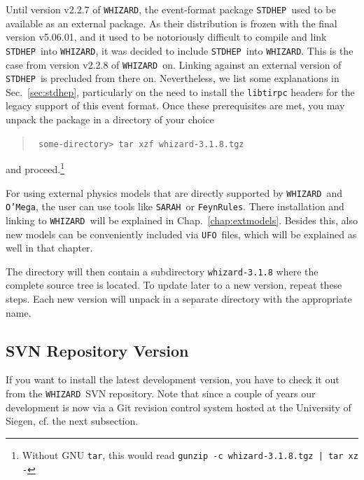 \documentclass[12pt]{book}
\newcommand{\ttt}[1]{\texttt{#1}}
\newcommand{\whizard}{\ttt{WHIZARD}}
\newcommand{\oMega}{\ttt{O'Mega}}
\newcommand{\stdhep}{\ttt{STDHEP}}
\newcommand{\sarah}{\ttt{SARAH}}
\newcommand{\FeynRules}{\ttt{FeynRules}}
\newcommand{\UFO}{\ttt{UFO}}
\newcommand{\thisversion}{3.1.8}
\begin{document}
Until version v2.2.7 of \whizard, the event-format package \stdhep\ used
to be available as an external package. As their distribution is frozen
with the final version v5.06.01, and it used to be notoriously difficult to
compile and link \stdhep\ into \whizard, it was decided to include \stdhep\
into \whizard. This is the case from version v2.2.8 of \whizard\ on. Linking
against an external version of \stdhep\ is precluded from there
on. Nevertheless, we list some explanations in Sec.~\ref{sec:stdhep},
particularly on the need to install the \ttt{libtirpc} headers for the
legacy support of this event format. Once these prerequisites are met,
you may unpack the package in a directory of your choice
\begin{quote}\small\tt
  some-directory> tar xzf whizard-\thisversion.tgz
\end{quote}
and proceed.\footnote{Without GNU \ttt{tar}, this would read
  \ttt{\small gunzip -c whizard-\thisversion.tgz | tar xz -}}

For using external physics models that are directly supported by
\whizard\ and \oMega, the user can use tools like \sarah\ or
\FeynRules. There installation and linking to \whizard\ will be
explained in Chap.~\ref{chap:extmodels}. Besides this, also new models
can be conveniently included via \UFO\ files, which will be explained
as well in that chapter.

The directory will then contain a subdirectory \ttt{whizard-\thisversion}
where the complete source tree is located.  To update later to a new
version, repeat these steps.  Each new version will unpack in a
separate directory with the appropriate name.


\subsection{SVN Repository Version}

If you want to install the latest development version, you have to
check it out from the \whizard\ SVN repository. Note that since a
couple of years our development is now via a Git revision control
system hosted at the University of Siegen, cf. the next subsection.
\end{document}
